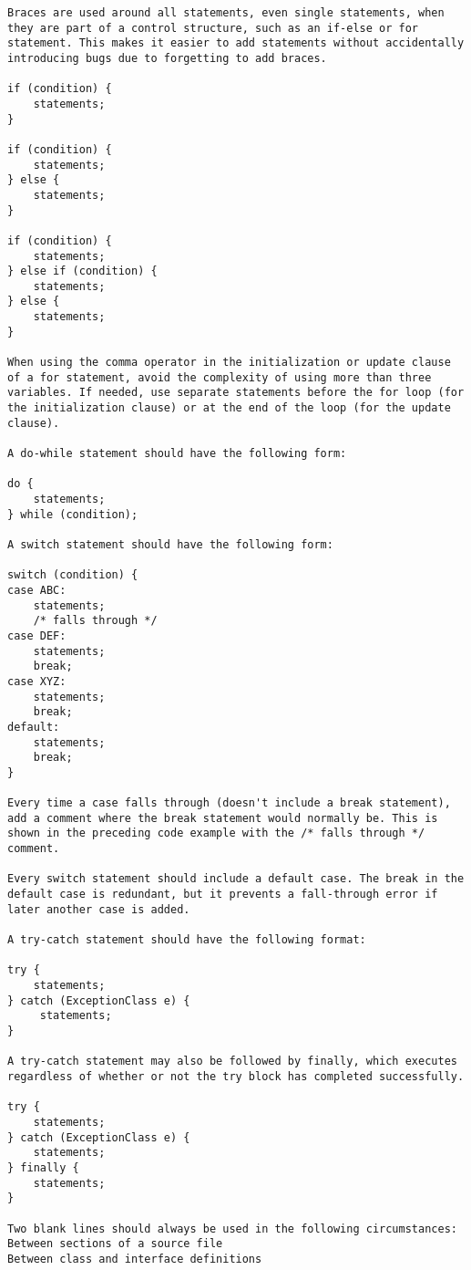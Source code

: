 \begin{lstlisting}
Braces are used around all statements, even single statements, when they are part of a control structure, such as an if-else or for statement. This makes it easier to add statements without accidentally introducing bugs due to forgetting to add braces.

if (condition) {
    statements;
}

if (condition) {
    statements;
} else {
    statements;
}

if (condition) {
    statements;
} else if (condition) {
    statements;
} else {
    statements;
}

When using the comma operator in the initialization or update clause of a for statement, avoid the complexity of using more than three variables. If needed, use separate statements before the for loop (for the initialization clause) or at the end of the loop (for the update clause).

A do-while statement should have the following form:

do {
    statements;
} while (condition);

A switch statement should have the following form:

switch (condition) {
case ABC:
    statements;
    /* falls through */
case DEF:
    statements;
    break;
case XYZ:
    statements;
    break;
default:
    statements;
    break;
}

Every time a case falls through (doesn't include a break statement), add a comment where the break statement would normally be. This is shown in the preceding code example with the /* falls through */ comment.

Every switch statement should include a default case. The break in the default case is redundant, but it prevents a fall-through error if later another case is added.

A try-catch statement should have the following format:

try {
    statements;
} catch (ExceptionClass e) {
     statements;
}

A try-catch statement may also be followed by finally, which executes regardless of whether or not the try block has completed successfully.

try {
    statements;
} catch (ExceptionClass e) {
    statements;
} finally {
    statements;
}

Two blank lines should always be used in the following circumstances:
Between sections of a source file
Between class and interface definitions


\end{lstlisting}
